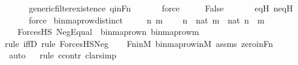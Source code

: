 \begin{isabellebody}
\ \ \ \ \isamarkupfalse%
\ generic{\isacharunderscore}{\kern0pt}filter{\isacharunderscore}{\kern0pt}existence\ qinFn\ \isanewline
\ \ \ \ \isamarkupfalse%
\ force\isanewline
\isanewline
\ \ \isamarkupfalse%
\ \isamarkupfalse%
\ False\ \isanewline
\ \ \ \ \isamarkupfalse%
\ eqH\ neqH\ \isanewline
\ \ \ \ \isamarkupfalse%
\ force\isanewline
{}\isamarkupfalse%
%
\endisatagproof
{\isafoldproof}%
%
\isadelimproof
\isanewline
%
\endisadelimproof
\isanewline
{}\isamarkupfalse%
\ binmap{\isacharunderscore}{\kern0pt}row{\isacharprime}{\kern0pt}{\isacharunderscore}{\kern0pt}distinct\ {\isacharcolon}{\kern0pt}\ \isanewline
\ \ \ n\ m\ \isanewline
\ \ \ {\isachardoublequoteopen}n\ {\isasymin}\ nat{\isachardoublequoteclose}\ {\isachardoublequoteopen}m\ {\isasymin}\ nat{\isachardoublequoteclose}\ {\isachardoublequoteopen}n\ {\isasymnoteq}\ m{\isachardoublequoteclose}\ \isanewline
\ \ \ {\isachardoublequoteopen}ForcesHS{\isacharparenleft}{\kern0pt}{}{\isacharcomma}{\kern0pt}\ Neg{\isacharparenleft}{\kern0pt}Equal{\isacharparenleft}{\kern0pt}{}{\isacharcomma}{\kern0pt}\ {}{\isacharparenright}{\kern0pt}{\isacharparenright}{\kern0pt}{\isacharcomma}{\kern0pt}\ {\isacharbrackleft}{\kern0pt}binmap{\isacharunderscore}{\kern0pt}row{\isacharprime}{\kern0pt}{\isacharparenleft}{\kern0pt}n{\isacharparenright}{\kern0pt}{\isacharcomma}{\kern0pt}\ binmap{\isacharunderscore}{\kern0pt}row{\isacharprime}{\kern0pt}{\isacharparenleft}{\kern0pt}m{\isacharparenright}{\kern0pt}{\isacharbrackright}{\kern0pt}{\isacharparenright}{\kern0pt}{\isachardoublequoteclose}\ \isanewline
%
\isadelimproof
\isanewline
\ \ %
\endisadelimproof
%
\isatagproof
{}\isamarkupfalse%
{\isacharparenleft}{\kern0pt}rule\ iffD{}{\isacharcomma}{\kern0pt}\ rule\ ForcesHS{\isacharunderscore}{\kern0pt}Neg{\isacharparenright}{\kern0pt}\isanewline
\ \ \isamarkupfalse%
\ Fn{\isacharunderscore}{\kern0pt}in{\isacharunderscore}{\kern0pt}M\ binmap{\isacharunderscore}{\kern0pt}row{\isacharprime}{\kern0pt}{\isacharunderscore}{\kern0pt}in{\isacharunderscore}{\kern0pt}M\ assms\ zero{\isacharunderscore}{\kern0pt}in{\isacharunderscore}{\kern0pt}Fn\isanewline
\ \ \ \ \ \isamarkupfalse%
\ auto{\isacharbrackleft}{\kern0pt}{}{\isacharbrackright}{\kern0pt}\isanewline
\ \ \isamarkupfalse%
{\isacharparenleft}{\kern0pt}rule\ ccontr{\isacharcomma}{\kern0pt}\ clarsimp{\isacharparenright}{\kern0pt}\isanewline

\end{isabellebody}
